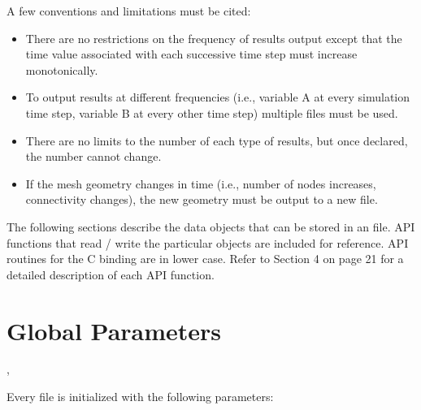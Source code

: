 A few conventions and limitations must be cited:
\begin{itemize}
 \item {There are no restrictions on the frequency of results output
 except that the time value associated with each successive time step
 must increase monotonically.}

 \item {To output results at different frequencies (i.e., variable A
 at every simulation time step, variable B at every other time step)
 multiple \exo{} files must be used.}

 \item {There are no limits to the number of each type of results, but
 once declared, the number cannot change. }

 \item {If the mesh geometry changes in time (i.e., number of nodes
 increases, connectivity changes), the new geometry must be output to
 a new \exo{} file.}
\end{itemize}

The following sections describe the data objects that can be stored in
an \exo{} file. API functions that read / write the particular objects
are included for reference. API routines for the C binding are in
lower case. Refer to Section 4 on page 21 for a detailed description
of each API function.

\section{Global Parameters}
\api{}, 

Every \exo{} file is initialized with the following parameters:

